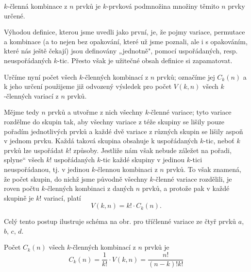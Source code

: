         \begin{mdframed}[style=highlight] 
          \(k\)-členná kombinace z \(n\) prvků je \(k\)-prvková podmnožina množiny těmito \(n\) 
          prvky určené.
        \end{mdframed}  

        Výhodou definice, kterou jsme uvedli jako první, je, že pojmy variace, permutace a kombinace
        (a to nejen bez opakování, které už jsme poznali, ale i s opakováním, které nás ještě
        čekají) jsou definovány „jednotně", pomocí uspořádaných, resp. neuspořádaných \(k\)-tic.
        Přesto však je užitečné obsah  definice si zapamatovat.
        
        Určíme nyní počet všech \(k\)-členných kombinací z \(n\) prvků; označíme jej \(C_k(n)\) a k
        jeho určení použijeme již odvozený výsledek pro počet \(V(k,n)\) všech \(k\)-členných
        variací z \(n\) prvků.

        Mějme tedy \(n\) prvků a utvořme z nich všechny \(k\)-členné variace; tyto variace rozdělme
        do skupin tak, aby všechny variace z téže skupiny se lišily pouze pořadím jednotlivých prvků
        a každé dvě variace z různých skupin se lišily aspoň v jednom prvku. Každá taková skupina
        obsahuje k uspořádaných \(k\)-tic, neboť \(k\) prvků lze uspořádat \(k!\) způsoby. Jestliže
        nám však nebude záležet na pořadi, splyne“ všech \(k!\) uspořádaných \(k\)-tic každé skupiny
        v jedinou \(k\)-tici neuspořádanou, tj. v jedinou \(k\)-člennou kombinaci z \(n\) prvků. To
        však znamená, že počet skupin, do nichž jsme původně všechny \(k\)-členné variace rozdělili,
        je roven počtu \(k\)-členných kombinaci z daných \(n\) prvků, a protože pak v každé skupině
        je \(k!\) variací, platí
        \begin{equation*}
          V(k,n) = k!\cdot C_k(n).
        \end{equation*}

        Celý tento postup ilustruje schéma na obr.  pro tříčlenné variace ze čtyř prvků \(a\),
        \(b\), \(c\), \(d\).

        
        Počet \(C_k(n)\) všech \(k\)-členných kombinací z \(n\) prvků je
        \begin{equation*}
          C_k(n) = \dfrac{1}{k!}\cdot V(k,n) = \dfrac{n!}{(n-k)!k!}
        \end{equation*}

